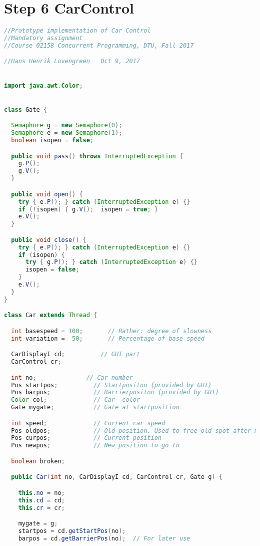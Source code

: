 \section*{Step 6 CarControl}
\begin{lstlisting}[language=java]
//Prototype implementation of Car Control
//Mandatory assignment
//Course 02158 Concurrent Programming, DTU, Fall 2017

//Hans Henrik Lovengreen   Oct 9, 2017


import java.awt.Color;


class Gate {

  Semaphore g = new Semaphore(0);
  Semaphore e = new Semaphore(1);
  boolean isopen = false;

  public void pass() throws InterruptedException {
    g.P(); 
    g.V();
  }

  public void open() {
    try { e.P(); } catch (InterruptedException e) {}
    if (!isopen) { g.V();  isopen = true; }
    e.V();
  }

  public void close() {
    try { e.P(); } catch (InterruptedException e) {}
    if (isopen) { 
      try { g.P(); } catch (InterruptedException e) {}
      isopen = false;
    }
    e.V();
  }
}

class Car extends Thread {

  int basespeed = 100;       // Rather: degree of slowness
  int variation =  50;       // Percentage of base speed

  CarDisplayI cd;          // GUI part
  CarControl cr;

  int no;              // Car number
  Pos startpos;          // Startpositon (provided by GUI)
  Pos barpos;            // Barrierpositon (provided by GUI)
  Color col;             // Car  color
  Gate mygate;           // Gate at startposition

  int speed;             // Current car speed
  Pos oldpos;            // Old position. Used to free old spot after move.
  Pos curpos;            // Current position 
  Pos newpos;            // New position to go to

  boolean broken;

  public Car(int no, CarDisplayI cd, CarControl cr, Gate g) {

    this.no = no;
    this.cd = cd;
    this.cr = cr;

    mygate = g;
    startpos = cd.getStartPos(no);
    barpos = cd.getBarrierPos(no);  // For later use


\end{lstlisting}
